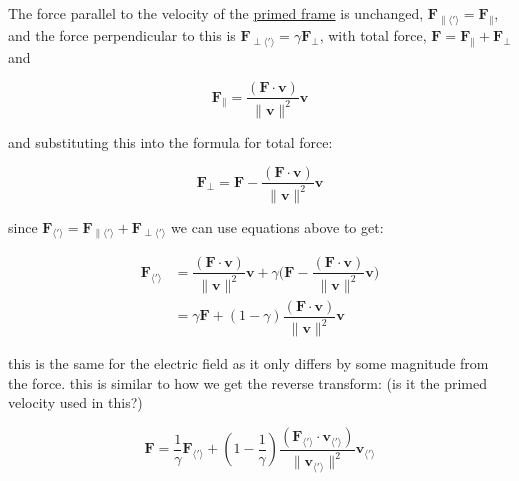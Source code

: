 The force parallel to the velocity of the \hyperlink{def-Primed-Frame}{primed frame} is unchanged, $\mathbf{F}_{\parallel \langle {'} \rangle} = \mathbf{F}_{\parallel}$, and the force perpendicular to this is $\mathbf{F}_{\perp \langle {'} \rangle} = {\gamma} \mathbf{F}_{\perp}$, with total force, $\mathbf{F} = \mathbf{F}_{\parallel} + \mathbf{F}_{\perp}$ and

\begin{equation}
	\mathbf{F}_{\parallel} = \dfrac{(\mathbf{F}\cdot\mathbf{v})}{\|\mathbf{v}\|^2}\mathbf{v}
\end{equation}

and substituting this into the formula for total force:

\begin{equation}
	\mathbf{F}_{\perp} = \mathbf{F}-\dfrac{(\mathbf{F}\cdot\mathbf{v})}{\|\mathbf{v}\|^2}\mathbf{v}
\end{equation}

since $\mathbf{F}_{\langle {'} \rangle} = \mathbf{F}_{\parallel \langle {'} \rangle} + \mathbf{F}_{\perp\langle {'} \rangle}$ we can use equations above to get:

\begin{equation}
	\begin{aligned}
		\mathbf{F}_{\langle {'} \rangle} & = \dfrac{(\mathbf{F}\cdot\mathbf{v})}{\|\mathbf{v}\|^2}\mathbf{v} + {\gamma}\bigg(\mathbf{F}-\dfrac{(\mathbf{F}\cdot\mathbf{v})}{\|\mathbf{v}\|^2}\mathbf{v}\bigg) \\
		                               & = {\gamma}\mathbf{F} + (1-{\gamma})\dfrac{(\mathbf{F}\cdot\mathbf{v})}{\|\mathbf{v}\|^2}\mathbf{v}
	\end{aligned}
\end{equation}

this is the same for the electric field as it only differs by some magnitude from the force.\newline
this is similar to how we get the reverse transform: (is it the primed velocity used in this?)

\begin{equation}
	\mathbf{F} = \dfrac{1}{{\gamma}}\mathbf{F}_{\langle {'} \rangle} + (1-\dfrac{1}{{\gamma}})\dfrac{(\mathbf{F}_{\langle {'} \rangle} \cdot\mathbf{v}_{\langle {'} \rangle} )}{\|\mathbf{v}_{\langle {'} \rangle} \|^2}\mathbf{v}_{\langle {'} \rangle}
\end{equation}

